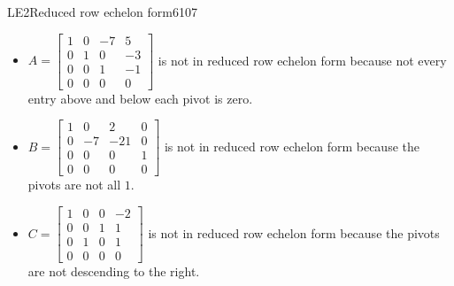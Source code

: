 \begin{exercise}{LE2}{Reduced row echelon form}{6107}
\begin{exerciseStatement}
     \end{exerciseStatement}
 \begin{exerciseAnswer} 

\begin{itemize}
\item  

 \(A=\left[\begin{array}{cccc}
1 & 0 & -7 & 5 \\
0 & 1 & 0 & -3 \\
0 & 0 & 1 & -1 \\
0 & 0 & 0 & 0
\end{array}\right]\) is not in reduced row echelon form because not every entry above and below each pivot is zero. 

 
\item  

 \(B=\left[\begin{array}{cccc}
1 & 0 & 2 & 0 \\
0 & -7 & -21 & 0 \\
0 & 0 & 0 & 1 \\
0 & 0 & 0 & 0
\end{array}\right]\) is not in reduced row echelon form because the pivots are not all \(1\). 

 
\item  

 \(C=\left[\begin{array}{cccc}
1 & 0 & 0 & -2 \\
0 & 0 & 1 & 1 \\
0 & 1 & 0 & 1 \\
0 & 0 & 0 & 0
\end{array}\right]\) is not in reduced row echelon form because the pivots are not descending to the right. 

 
\end{itemize}

     \end{exerciseAnswer}
 \end{exercise}


